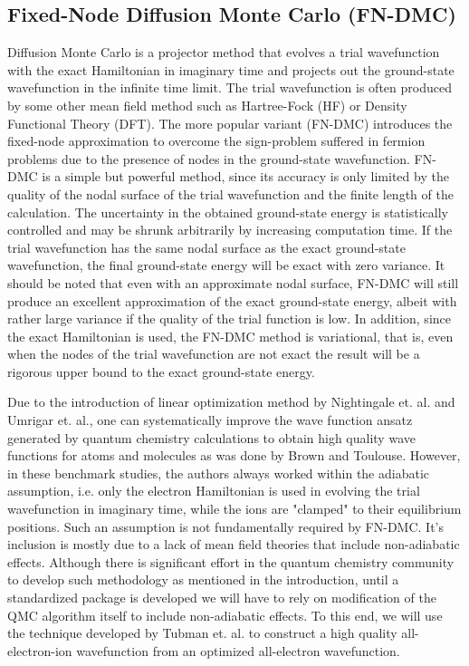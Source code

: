 \documentclass[aps,prl,superscriptaddress,groupedaddress]{revtex4}
\begin{document}
\subsection{Fixed-Node Diffusion Monte Carlo (FN-DMC)}
Diffusion Monte Carlo is a projector method that evolves a trial wavefunction with the exact Hamiltonian in imaginary time and projects out the ground-state wavefunction in the infinite time limit. The trial wavefunction is often produced by some other mean field method such as Hartree-Fock (HF) or Density Functional Theory (DFT). The more popular variant (FN-DMC) introduces the fixed-node approximation to overcome the sign-problem suffered in fermion problems due to the presence of nodes in the ground-state wavefunction. FN-DMC is a simple but powerful method, since its accuracy is only limited by the quality of the nodal surface of the trial wavefunction and the finite length of the calculation. The uncertainty in the obtained ground-state energy is statistically controlled and may be shrunk arbitrarily by increasing computation time. If the trial wavefunction has the same nodal surface as the exact ground-state wavefunction, the final ground-state energy will be exact with zero variance. It should be noted that even with an approximate nodal surface, FN-DMC will still produce an excellent approximation of the exact ground-state energy, albeit with rather large variance if the quality of the trial function is low. In addition, since the exact Hamiltonian is used, the FN-DMC method is variational, that is, even when the nodes of the trial wavefunction are not exact the result will be a rigorous upper bound to the exact ground-state energy.

Due to the introduction of linear optimization method by Nightingale et. al.\cite{Nightingale_Linear} and Umrigar et. al.\cite{Umrigar_Linear}, one can systematically improve the wave function ansatz generated by quantum chemistry calculations to obtain high quality wave functions for atoms and molecules as was done by Brown\cite{Brown_Bench} and Toulouse\cite{Toulouse_Bench}. However, in these benchmark studies, the authors always worked within the adiabatic assumption, i.e. only the electron Hamiltonian is used in evolving the trial wavefunction in imaginary time, while the ions are "clamped" to their equilibrium positions. Such an assumption is not fundamentally required by FN-DMC. It's inclusion is mostly due to a lack of mean field theories that include non-adiabatic effects. Although there is significant effort in the quantum chemistry community to develop such methodology as mentioned in the introduction, until a standardized package is developed we will have to rely on modification of the QMC algorithm itself to include non-adiabatic effects. To this end, we will use the technique developed by Tubman et. al. \cite{Tubman_ECG} to construct a high quality all-electron-ion wavefunction from an optimized all-electron wavefunction.
\end{document}
